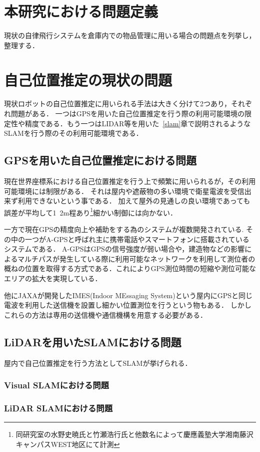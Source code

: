 \section{本研究における問題定義}
現状の自律飛行システムを倉庫内での物品管理に用いる場合の問題点を列挙し，整理する．

\section{自己位置推定の現状の問題}
現状ロボットの自己位置推定に用いられる手法は大きく分けて2つあり，それぞれ問題がある．
一つはGPSを用いた自己位置推定を行う際の利用可能環境の限定性や精度である．もう一つはLIDAR等を用いた~\ref{slam}章で説明されるようなSLAMを行う際のその利用可能環境である．

\subsection{GPSを用いた自己位置推定における問題}
現在世界座標系における自己位置推定を行う上で頻繁に用いられるが，その利用可能環境には制限がある．
それは屋内や遮蔽物の多い環境で衛星電波を受信出来ず利用できないという事である．
加えて屋外の見通しの良い環境であっても誤差が平均して1~2m程あり\footnote{同研究室の水野史暁氏と竹瀬浩行氏と他数名によって慶應義塾大学湘南藤沢キャンパスWEST地区にて計測}細かい制御には向かない．

一方で現在GPSの精度向上や補助をする為のシステムが複数開発されている.
その中の一つがA-GPS\cite{agps}と呼ばれ主に携帯電話やスマートフォンに搭載されているシステムである．
A-GPSはGPSの信号強度が弱い場合や，建造物などの影響によるマルチパスが発生している際に利用可能なネットワークを利用して測位者の概ねの位置を取得する方式である．これによりGPS測位時間の短縮や測位可能なエリアの拡大を実現している．

他にJAXAが開発したIMES(Indoor MEssaging System)\cite{imes}という屋内にGPSと同じ電波を利用した送信機を設置し細かい位置測位を行うという物もある．
しかしこれらの方法は専用の送信機や通信機構を用意する必要がある．


\subsection{LiDARを用いたSLAMにおける問題}
屋内で自己位置推定を行う方法としてSLAMが挙げられる．

\subsubsection{Visual SLAMにおける問題}

\subsubsection{LiDAR SLAMにおける問題}

